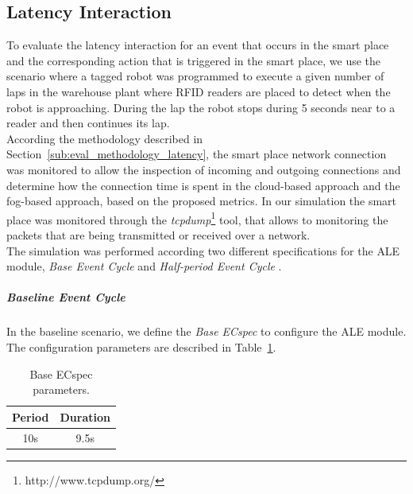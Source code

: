 \subsection{Latency Interaction}
\label{sub:eval_exp_latency}
To evaluate the latency interaction for an event that occurs in the smart place and the corresponding
action that is triggered in the smart place, we use the scenario where a tagged robot was programmed to
execute a given number of laps in the warehouse plant where \gls{RFID} readers are placed to detect
when the robot is approaching. During the lap the robot stops during 5 seconds near to a reader and
then continues its lap.\\

According the methodology described in Section~\ref{sub:eval_methodology_latency}, the smart place
network connection was monitored to allow the inspection of incoming and outgoing connections and
determine how the connection time is spent in the cloud-based approach and the fog-based approach,
based on the proposed metrics. In our simulation the smart place was monitored through the
\textit{tcpdump}\footnote{http://www.tcpdump.org/} tool, that allows to monitoring the packets that
are being transmitted or received over a network.\\

The simulation was performed according two different specifications for the \gls{ALE} module,
\textit{Base Event Cycle} and \textit{Half-period Event Cycle} .

\subparagraph{Baseline Event Cycle}
\label{subp:eval_exp_latency_ecspec}
 In the baseline scenario, we define the \textit{Base ECspec} to configure the \gls{ALE} module. The
 configuration parameters are described in Table~\ref{table:ecspec_base}.

 \begin{table}[ht!]
   \begin{tabular}{|c|c|}
     \hline
     Period & Duration \\ \hline
     10s    & 9.5s     \\ \hline
  \end{tabular}
  \caption{Base ECspec parameters.}
  \label{table:ecspec_base}
 \end{table}

